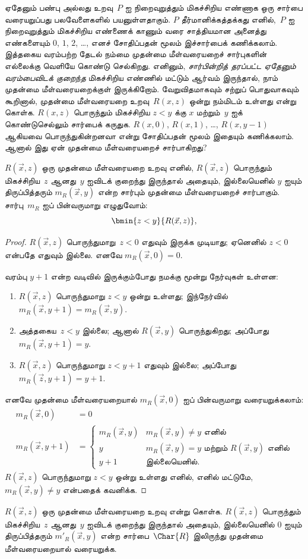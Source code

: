 \documentclass[../../../include/open-logic-section]{subfiles}
\begin{document}


\begin{explain}
ஏதேனும் பண்பு அல்லது உறவு~$P$ ஐ நிறைவுறுத்தும் மிகச்சிறிய எண்ணாக
ஒரு சார்பை வரையறுப்பது பலவேளைகளில் பயனுள்ளதாகும். $P$
தீர்மானிக்கத்தக்கது எனில்,~$P$ ஐ நிறைவுறுத்தும் மிகச்சிறிய எண்ணைக்
காணும் வரை சாத்தியமான அனைத்து எண்களையும் $0$, $1$, $2$, \dots,
எனச் சோதிப்பதன் மூலம் இச்சார்பைக் கணிக்கலாம். இத்தகைய வரம்பற்ற தேடல்
நம்மை முதன்மை மீள்வரையறைச் சார்புகளின் எல்லைக்கு வெளியே கொண்டு
செல்கிறது. எனினும், \emph{சார்பின்றித் தரப்பட்ட ஏதேனும் வரம்பைவிடக்
குறைந்த} மிகச்சிறிய எண்ணில் மட்டும் ஆர்வம் இருந்தால், நாம் முதன்மை
மீள்வரையறைக்குள் இருக்கிறோம். வேறுவிதமாகவும் சற்றுப் பொதுவாகவும்
கூறினால், முதன்மை மீள்வரையறை உறவு~$R(x,z)$ ஒன்று நம்மிடம் உள்ளது
என்று கொள்க. $R(x, z)$ பொருந்தும் மிகச்சிறிய $z < y$ க்கு
$x$ மற்றும்~$y$ ஐக் கொண்டுசெல்லும் சார்பைக் கருதுக. $R(x, 0)$,
$R(x, 1)$, \dots, $R(x, y-1)$ ஆகியவை பொருந்துகின்றனவா என்று
சோதிப்பதன் மூலம் இதையும் கணிக்கலாம். ஆனால் இது ஏன் முதன்மை
மீள்வரையறைச் சார்பாகிறது?
\end{explain}

\begin{prop}
$R(\vec x, z)$ ஒரு முதன்மை மீள்வரையறை உறவு எனில்,
$R(\vec x, z)$ பொருந்தும் மிகச்சிறிய~$z$ ஆனது~$y$ ஐவிடக் குறைந்து
இருந்தால்
அதையும், இல்லையெனில் $y$ ஐயும் திருப்பித்தரும்
$m_R(\vec{x}, y)$ என்ற சார்பும் முதன்மை மீள்வரையறைச் சார்பாகும்.
சார்பு~$m_R$ ஐப் பின்வருமாறு எழுதுவோம்:
\[
\bmin{z < y}{R(\vec{x}, z)},
\]
\end{prop}

\begin{proof}
$R(\vec{x}, z)$ பொருந்துமாறு~$z < 0$ எதுவும் இருக்க முடியாது;
ஏனெனில் $z < 0$ என்பதே எதுவும் இல்லை. எனவே
$m_R(\vec x, 0) = 0$.

வரம்பு $y + 1$ என்ற வடிவில் இருக்கும்போது நமக்கு மூன்று நேர்வுகள்
உள்ளன:
\begin{enumerate}
\item $R(\vec{x}, z)$ பொருந்துமாறு $z < y$ ஒன்று உள்ளது; இந்நேர்வில்
$m_R(\vec{x}, y+1) = m_R(\vec{x}, y)$.
\item அத்தகைய~$z<y$ இல்லை; ஆனால் $R(\vec{x}, y)$ பொருந்துகிறது;
அப்போது $m_R(\vec{x}, y+1) = y$.
\item $R(\vec{x}, z)$ பொருந்துமாறு $z < y+1$ எதுவும் இல்லை;
அப்போது $m_R(\vec{z}, y+1) = y+1$.
\end{enumerate}
எனவே முதன்மை மீள்வரையறையால் $m_R(\vec x, 0)$ ஐப் பின்வருமாறு
வரையறுக்கலாம்:
\begin{align*}
m_R(\vec{x}, 0) & = 0\\
m_R(\vec{x}, y+1) & =
\begin{cases}
m_R(\vec{x}, y) & \text{$m_R(\vec x, y) \neq y$ எனில்}\\
y & \text{$m_R(\vec x, y) = y$ மற்றும் $R(\vec{x}, y)$ எனில்}\\
y+1 & \text{இல்லையெனில்.}
\end{cases}
\end{align*}
$R(\vec x, z)$ பொருந்துமாறு $z<y$ ஒன்று உள்ளது எனில், எனில்
மட்டுமே, $m_R(\vec x, y) \neq y$ என்பதைக் கவனிக்க.
\end{proof}

\begin{prob}
$R(\vec x, z)$ ஒரு முதன்மை மீள்வரையறை உறவு என்று கொள்க.
$R(\vec{x}, z)$ பொருந்தும் மிகச்சிறிய~$z$ ஆனது~$y$ ஐவிடக் குறைந்து
இருந்தால்
அதையும், இல்லையெனில் $0$ ஐயும் திருப்பித்தரும்
$m'_R(\vec{x}, y)$ என்ற சார்பை~$\Char{R}$ இலிருந்து முதன்மை
மீள்வரையறையால் வரையறுக்க.
\end{prob}
\end{document}
